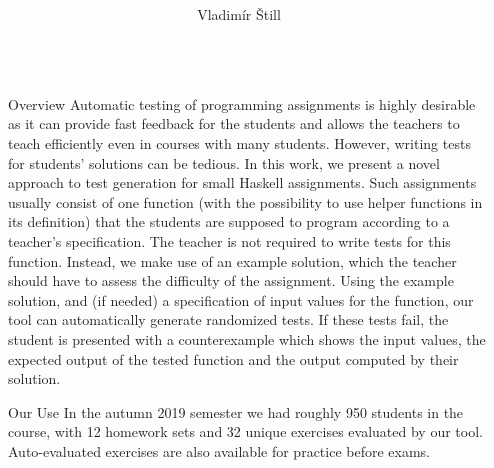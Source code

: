 \documentclass[final, 20pt, a0]{beamer}
\title{%
  \texorpdfstring{%
    \makebox[\linewidth]{%
      \noindent\hspace*{0.5em} %
      \hfill %
      \begin{minipage}{\linewidth-3em}\center\titletext\end{minipage} %
      \hfill %
      \hspace*{0.5em}%
    }\bigskip%
  }
  {\titletext}}
\author{Vladimír Štill}
\institute{Faculty of Informatics, Masaryk University\\Czech Republic\vspace*{-2cm}} %
\newlength{\marginwid}
\newlength{\onecolwid}
\begin{document}

\setlength{\belowcaptionskip}{2ex} %
\setlength\belowdisplayshortskip{2ex} %

\begin{frame}[t,fragile] %

\begin{columns}[t] %

\begin{column}{\marginwid}\end{column} %
\begin{column}{\onecolwid} %

\begin{block}{Overview}
    Automatic testing of programming assignments is highly desirable as it can
    provide fast feedback for the students and allows the teachers to teach
    efficiently even in courses with many students.
    However, writing tests for students' solutions can be tedious.
    In this work, we present a novel approach to test generation for small Haskell
    assignments.
    Such assignments usually consist of one function (with the possibility to use
    helper functions in its definition) that the students are supposed to program
    according to a teacher's specification.
    The teacher is not required to write tests for this function.
    Instead, we make use of an example solution, which the teacher should have
    to assess the difficulty of the assignment.
    Using the example solution, and (if needed) a specification of input values for
    the function, our tool can automatically generate randomized tests.
    If these tests fail, the student is presented with a counterexample which
    shows the input values, the expected output of the tested function and the
    output computed by their solution.
\end{block}

\begin{block}{Our Use}
    In the autumn 2019 semester we had roughly 950 students in the course, with
    12 homework sets and 32 unique exercises evaluated by our tool.
    Auto-evaluated exercises are also available for practice before exams.
\end{block}


\end{column}
\end{columns}
\end{frame}
\end{document}
